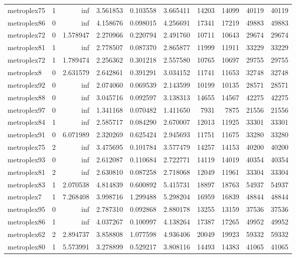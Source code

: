 \begin{longtable}{|l|r|r|r|r|r|r|r|r|r|}
metroplex75 & 1 & inf & 3.561853 & 0.103558 & 3.665411 & 14203 & 14099 & 40119 & 40119 \\
metroplex86 & 0 & inf & 4.158676 & 0.098015 & 4.256691 & 17341 & 17219 & 49883 & 49883 \\
metroplex72 & 0 & 1.578947 & 2.270966 & 0.220794 & 2.491760 & 10711 & 10643 & 29674 & 29674 \\
metroplex81 & 1 & inf & 2.778507 & 0.087370 & 2.865877 & 11999 & 11911 & 33229 & 33229 \\
metroplex72 & 1 & 1.789474 & 2.256362 & 0.301218 & 2.557580 & 10765 & 10697 & 29755 & 29755 \\
metroplex8 & 0 & 2.631579 & 2.642861 & 0.391291 & 3.034152 & 11741 & 11653 & 32748 & 32748 \\
metroplex92 & 0 & inf & 2.074060 & 0.069539 & 2.143599 & 10199 & 10135 & 28571 & 28571 \\
metroplex88 & 0 & inf & 3.045716 & 0.092597 & 3.138313 & 14655 & 14567 & 42275 & 42275 \\
metroplex97 & 0 & inf & 1.341168 & 0.070482 & 1.411650 & 7931 & 7875 & 21556 & 21556 \\
metroplex84 & 1 & inf & 2.585717 & 0.084290 & 2.670007 & 12013 & 11925 & 33301 & 33301 \\
metroplex91 & 0 & 6.071989 & 2.320269 & 0.625424 & 2.945693 & 11751 & 11675 & 33280 & 33280 \\
metroplex75 & 2 & inf & 3.475695 & 0.101784 & 3.577479 & 14257 & 14153 & 40200 & 40200 \\
metroplex93 & 0 & inf & 2.612087 & 0.110684 & 2.722771 & 14119 & 14019 & 40354 & 40354 \\
metroplex81 & 2 & inf & 2.630810 & 0.087258 & 2.718068 & 12049 & 11961 & 33304 & 33304 \\
metroplex83 & 1 & 2.070538 & 4.814839 & 0.600892 & 5.415731 & 18897 & 18763 & 54937 & 54937 \\
metroplex7 & 1 & 7.268408 & 3.998716 & 1.299488 & 5.298204 & 16959 & 16839 & 48844 & 48844 \\
metroplex95 & 0 & inf & 2.787310 & 0.092868 & 2.880178 & 13255 & 13159 & 37536 & 37536 \\
metroplex86 & 1 & inf & 4.037267 & 0.100997 & 4.138264 & 17387 & 17265 & 49952 & 49952 \\
metroplex62 & 2 & 2.894737 & 3.858808 & 1.077598 & 4.936406 & 20049 & 19923 & 59332 & 59332 \\
metroplex80 & 1 & 5.573991 & 3.278899 & 0.529217 & 3.808116 & 14493 & 14383 & 41065 & 41065 \\

\end{longtable}
